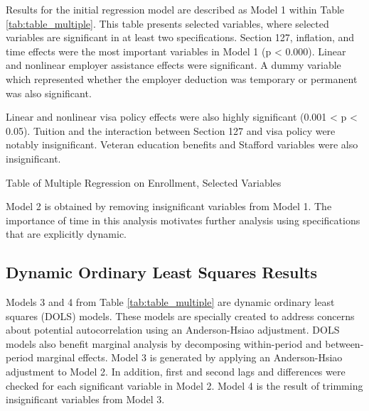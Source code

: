 \documentclass[review]{elsarticle}
\begin{document}
Results for the initial regression model are described as Model 1 within Table \ref{tab:table_multiple}.
This table presents selected variables, where selected variables are significant in at least two specifications.
Section 127, inflation, and time effects were the most important variables in Model 1 (p < 0.000).
Linear and nonlinear employer assistance effects were significant.
A dummy variable which represented whether the employer deduction was temporary or permanent was also significant.

Linear and nonlinear visa policy effects were also highly significant (0.001 < p < 0.05).
Tuition and the interaction between Section 127 and visa policy were notably insignificant.
Veteran education benefits and Stafford variables were also insignificant.

\begin{table}
    \caption{Table of Multiple Regression on Enrollment, Selected Variables}
    \resizebox{\columnwidth}{!}{
        
    }
    \label{tab:table_multiple}
\end{table}

Model 2 is obtained by removing insignificant variables from Model 1.
The importance of time in this analysis motivates further analysis using specifications that are explicitly dynamic.

\subsection{Dynamic Ordinary Least Squares Results}

Models 3 and 4 from Table \ref{tab:table_multiple} are dynamic ordinary least squares (DOLS) models.
These models are specially created to address concerns about potential autocorrelation using an Anderson-Hsiao adjustment\cite{anderson1981estimation}.
DOLS models also benefit marginal analysis by decomposing within-period and between-period marginal effects.
Model 3 is generated by applying an Anderson-Hsiao adjustment to Model 2.
In addition, first and second lags and differences were checked for each significant variable in Model 2.
Model 4 is the result of trimming insignificant variables from Model 3.
\end{document}
